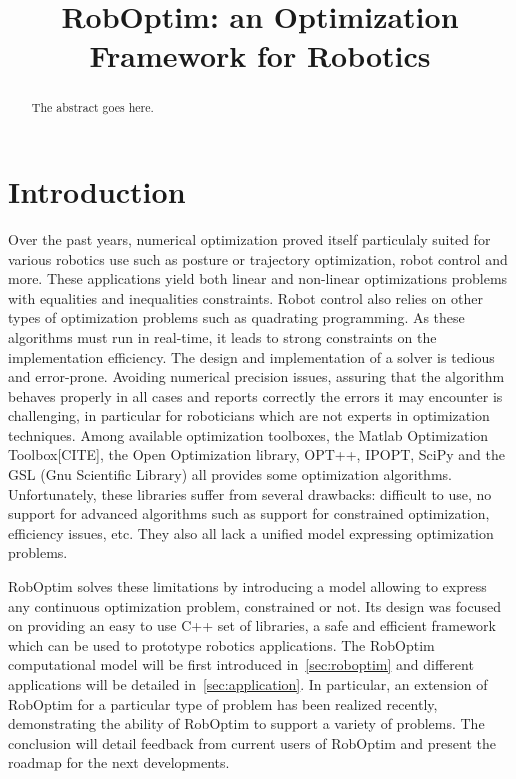 \documentclass[conference,final,a4paper,twocolumn,9pt]{IEEEtran}
\begin{document}
\title{RobOptim: an Optimization Framework for Robotics}

\author{
\and
{}
\and
{}
\and
{}
}

\maketitle

\begin{abstract}
\boldmath
The abstract goes here.
\end{abstract}

\IEEEpeerreviewmaketitle

\section{Introduction}\label{sec:introduction}


Over the past years, numerical optimization proved itself particulaly
suited for various robotics use such as posture or trajectory
optimization, robot control and more. These applications yield both
linear and non-linear optimizations problems with equalities and
inequalities constraints. Robot control also relies on other types of
optimization problems such as quadrating programming. As these
algorithms must run in real-time, it leads to strong constraints on
the implementation efficiency. The design and implementation of a
solver is tedious and error-prone. Avoiding numerical precision
issues, assuring that the algorithm behaves properly in all cases and
reports correctly the errors it may encounter is challenging, in
particular for roboticians which are not experts in optimization
techniques. Among available optimization toolboxes, the Matlab
Optimization Toolbox[CITE], the Open Optimization library, OPT++,
IPOPT, SciPy and the GSL (Gnu Scientific Library) all provides some
optimization algorithms. Unfortunately, these libraries suffer from
several drawbacks: difficult to use, no support for advanced
algorithms such as support for constrained optimization, efficiency
issues, etc. They also all lack a unified model expressing
optimization problems.


RobOptim solves these limitations by introducing a model allowing to
express any continuous optimization problem, constrained or not. Its
design was focused on providing an easy to use C++ set of libraries, a
safe and efficient framework which can be used to prototype robotics
applications. The RobOptim computational model will be first
introduced in~\autoref{sec:roboptim} and different applications will
be detailed in~\autoref{sec:application}. In particular, an extension
of RobOptim for a particular type of problem has been realized
recently, demonstrating the ability of RobOptim to support a variety
of problems. The conclusion will detail feedback from current users of
RobOptim and present the roadmap for the next developments.
\end{document}
